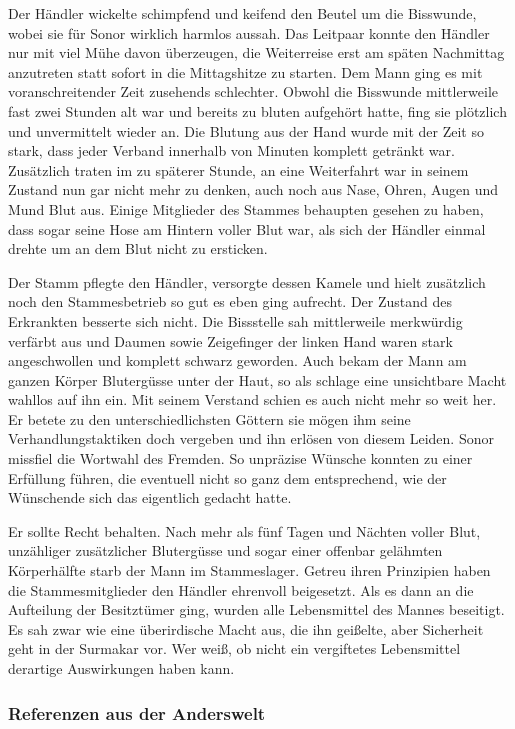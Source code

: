 \documentclass[a4paper]{scrreprt}
\begin{document}
	Der Händler wickelte schimpfend und keifend den Beutel um die Bisswunde, wobei sie für Sonor wirklich harmlos aussah. 
	Das Leitpaar konnte den Händler nur mit viel Mühe davon überzeugen, die Weiterreise erst am späten Nachmittag anzutreten statt sofort in die Mittagshitze zu starten.
	Dem Mann ging es mit voranschreitender Zeit zusehends schlechter. 
	Obwohl die Bisswunde mittlerweile fast zwei Stunden alt war und bereits zu bluten aufgehört hatte, fing sie plötzlich und unvermittelt wieder an.
	Die Blutung aus der Hand wurde mit der Zeit so stark, dass jeder Verband innerhalb von Minuten komplett getränkt war. 
	Zusätzlich traten im zu späterer Stunde, an eine Weiterfahrt war in seinem Zustand nun gar nicht mehr zu denken, auch noch aus Nase, Ohren, Augen und Mund Blut aus.
	Einige Mitglieder des Stammes behaupten gesehen zu haben, dass sogar seine Hose am Hintern voller Blut war, als sich der Händler einmal drehte um an dem Blut nicht zu ersticken.
	
	Der Stamm pflegte den Händler, versorgte dessen Kamele und hielt zusätzlich noch den Stammesbetrieb so gut es eben ging aufrecht. Der Zustand des Erkrankten besserte sich nicht. Die Bissstelle sah mittlerweile merkwürdig verfärbt aus und Daumen sowie Zeigefinger der linken Hand waren stark angeschwollen und komplett schwarz geworden.
	Auch bekam der Mann am ganzen Körper Blutergüsse unter der Haut, so als schlage eine unsichtbare Macht wahllos auf ihn ein.
	Mit seinem Verstand schien es auch nicht mehr so weit her. 
	Er betete zu den unterschiedlichsten Göttern sie mögen ihm seine Verhandlungstaktiken doch vergeben und ihn erlösen von diesem Leiden.
	Sonor missfiel die Wortwahl des Fremden. 
	So unpräzise Wünsche konnten zu einer Erfüllung führen, die eventuell nicht so ganz dem entsprechend, wie der Wünschende sich das eigentlich gedacht hatte.
	 
	Er sollte Recht behalten. 
	Nach mehr als fünf Tagen und Nächten voller Blut, unzähliger zusätzlicher Blutergüsse und sogar einer offenbar gelähmten Körperhälfte starb der Mann im Stammeslager. 
	Getreu ihren Prinzipien haben die Stammesmitglieder den Händler ehrenvoll beigesetzt.
	Als es dann an die Aufteilung der Besitztümer ging, wurden alle Lebensmittel des Mannes beseitigt. 
	Es sah zwar wie eine überirdische Macht aus, die ihn geißelte, aber Sicherheit geht in der Surmakar vor.
	Wer weiß, ob nicht ein vergiftetes Lebensmittel derartige Auswirkungen haben kann. 
	

	\subsubsection{Referenzen aus der Anderswelt}
	
\end{document}
